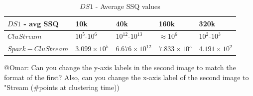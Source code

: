 \begin{table}[t]
\centering
  \begin{tabular}{|l|l|l|l|l|}\hline
\textbf{$DS1$ - avg SSQ} & \textbf{10k} & \textbf{40k} & \textbf{160k} & \textbf{320k}\\\hline
$CluStream$ & $10^5$-$10^6$ & $10^{12}$-$10^{13}$ & $\approx 10^6$ & $10^2$-$10^3$\\\hline
$Spark-CluStream$ & $3.099\times10^5$ & $6.676\times10^{12}$ & $7.833\times10^5$ & $4.191\times10^2$\\\hline
  \end{tabular}
  \caption{$DS1$ - Average SSQ values}
  \label{tab:DS1quality}
\end{table}

\color{red}@Omar: Can you change the y-axis labels in the second image to match the format of the first? \color{black}
\color{red}Also, can you change the x-axis label of the second image to "Stream (\#points at clustering time))
\color{black}

